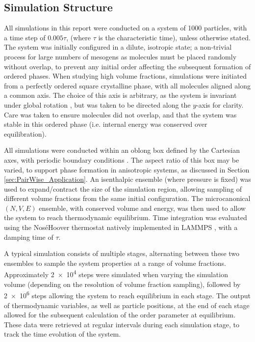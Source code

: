 \documentclass[11pt, a4paper]{article} %
\begin{document}
\subsection{Simulation Structure} %
All simulations in this report were conducted on a system of 1000 particles, with a time step of $0.005\tau$, (where $\tau$ is the characteristic time), unless otherwise stated. The system was initially configured in a dilute, isotropic state; a non-trivial process for large numbers of mesogens as molecules must be placed randomly without overlap, to prevent any initial order affecting the subsequent formation of ordered phases. When studying high volume fractions, simulations were initiated from a perfectly ordered square crystalline phase, with all molecules aligned along a common axis. The choice of this axis is arbitrary, as the system is invariant under global rotation \cite{Nos1983}, but was taken to be directed along the $y$-axis for clarity. Care was taken to ensure molecules did not overlap, and that the system was stable in this ordered phase (i.e. internal energy was conserved over equilibration).

All simulations were conducted within an oblong box defined by the Cartesian axes, with periodic boundary conditions \cite{Frenkel2002}. The aspect ratio of this box may be varied, to support phase formation in anisotropic systems, as discussed in Section \ref{sec:PairWise_Application}. An isenthalpic ensemble (where pressure is fixed) was used to expand/contract the size of the simulation region, allowing sampling of different volume fractions from the same initial configuration. The microcanonical $(N,V,E)$ ensemble, with conserved volume and energy, was then used to allow the system to reach thermodynamic equilibrium. Time integration was evaluated using the Nos\'e\textendash Hoover thermostat \cite{Nos1984, Hoover1985} natively implemented in LAMMPS \cite{Shinoda2004}, with a damping time of $\tau$.

A typical simulation consists of multiple stages, alternating between these two ensembles to sample the system properties at a range of volume fractions. Approximately \num{2e4} steps were simulated when varying the simulation volume (depending on the resolution of volume fraction sampling), followed by \num{2e6} steps allowing the system to reach equilibrium in each stage. The output of thermodynamic variables, as well as particle positions, at the end of each stage allowed for the subsequent calculation of the order parameter at equilibrium. These data were retrieved at regular intervals during each simulation stage, to track the time evolution of the system.
\end{document}

